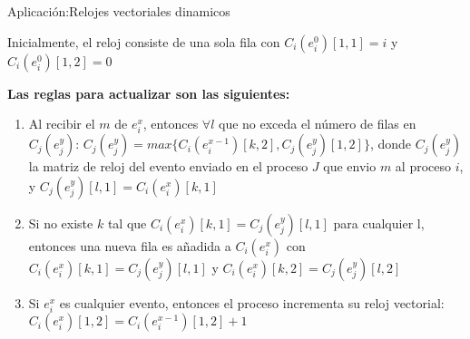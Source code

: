 \begin{frame}[fragile]{Aplicación:}{Relojes vectoriales dinamicos}
    \justifying

    Inicialmente, el reloj consiste de una sola fila con $C_i(e_i^0)[1,1]=i$ y $C_i(e_i^0)[1,2]=0$

    \textbf{Las reglas para actualizar son las siguientes:} 
    
    \begin{enumerate}
        \item Al recibir el $m$ de $e_i^x$, entonces $\forall l$ que no exceda el número de filas en $C_j(e_j^y)$: $C_j(e_j^y) = max\{C_i(e_i^{x-1})[k,2], C_j(e_j^y)[1,2]\}$, donde $C_j(e_j^y)$ la matriz de reloj del evento enviado en el proceso $J$ que envio $m$ al proceso $i$, y $C_j(e_j^y)[l,1]=C_i(e_i^x)[k,1]$
        
        \item Si no existe $k$ tal que $C_i(e_i^x)[k,1] = C_j(e_j^y)[l,1]$ para cualquier l, entonces una nueva fila es añadida a $C_i(e_i^x)$ con $C_i(e_i^x)[k,1] = C_j(e_j^y)[l,1]$ y $C_i(e_i^x)[k,2] = C_j(e_j^y)[l,2]$
        
        \item Si $e_i^x$ es cualquier evento, entonces el proceso incrementa su reloj vectorial: $C_i(e_i^x)[1,2] = C_i(e_i^{x-1})[1,2]+1$

  \end{enumerate}
\end{frame}